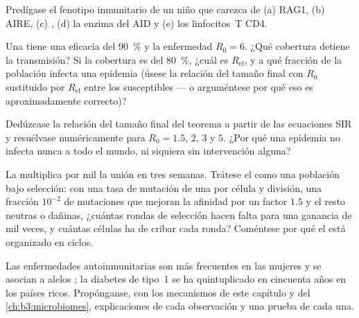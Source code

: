 \begin{exercise}[$\star\star$]\label{exo:b3:adaptive-immunity:8}
Predígase el fenotipo inmunitario de un niño que carezca de (a) RAG1,
(b) AIRE, (c) , (d) la enzima del  AID y (e) los
linfocitos~T CD4.
\end{exercise}

\begin{exercise}[$\star\star$]\label{exo:b3:adaptive-immunity:9}
Una  tiene una eficacia del \qty{90}{\%} y la enfermedad
$R_{0} = 6$. ¿Qué cobertura detiene la transmisión? Si la cobertura es
del \qty{80}{\%}, ¿cuál es $R_{\text{ef}}$, y a qué fracción de la
población infecta una epidemia (úsese la relación del tamaño final con
$R_{0}$ sustituido por $R_{\text{ef}}$ entre los susceptibles --- o
arguméntese por qué eso es aproximadamente correcto)?
\end{exercise}

\begin{exercise}[$\star\star\star$]\label{exo:b3:adaptive-immunity:10}
Dedúzcase la relación del tamaño final del teorema a partir de las
ecuaciones SIR y resuélvase numéricamente para $R_{0} = 1.5$, $2$, $3$ y
$5$. ¿Por qué una epidemia no infecta nunca a todo el mundo, ni siquiera
sin intervención alguna?
\end{exercise}

\begin{exercise}[$\star\star\star$]\label{exo:b3:adaptive-immunity:11}
La  multiplica por mil la unión en tres semanas.
Trátese el  como una población bajo selección: con una
tasa de mutación de una por célula y división, una fracción $10^{-2}$ de
mutaciones que mejoran la afinidad por un factor $1.5$ y el resto
neutras o dañinas, ¿cuántas rondas de selección hacen falta para una
ganancia de mil veces, y cuántas células ha de cribar cada ronda?
Coméntese por qué el  está organizado en ciclos.
\end{exercise}

\begin{exercise}[$\star\star\star$]\label{exo:b3:adaptive-immunity:12}
Las enfermedades autoinmunitarias son más frecuentes en las mujeres y se
asocian a alelos ; la diabetes de tipo~1 se ha quintuplicado en
cincuenta años en los países ricos. Propónganse, con los mecanismos de
este capítulo y del \cref{ch:b3:microbiomes}, explicaciones de cada
observación y una prueba de cada una.
\end{exercise}

